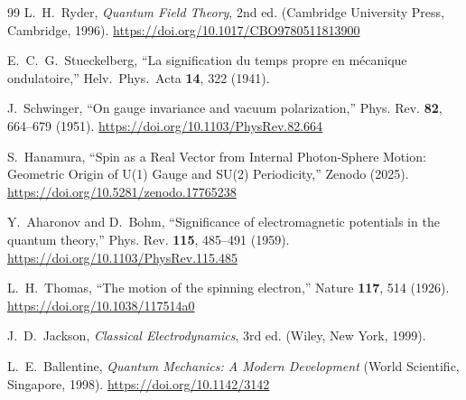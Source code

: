 \documentclass[%
 reprint,
 amsmath,amssymb,
 aps,
 prb,
]{revtex4-2}
\numberwithin{equation}{section}
\begin{document}
\begin{thebibliography}{99}
L.~H.~Ryder,
\textit{Quantum Field Theory}, 2nd ed.
(Cambridge University Press, Cambridge, 1996).
\href{https://doi.org/10.1017/CBO9780511813900}{https://doi.org/10.1017/CBO9780511813900}

E.~C.~G.~Stueckelberg,
``La signification du temps propre en m\'ecanique ondulatoire,''
Helv.\ Phys.\ Acta {\bf 14}, 322 (1941).

J.~Schwinger,
``On gauge invariance and vacuum polarization,''
Phys. Rev. \textbf{82}, 664--679 (1951).
\href{https://doi.org/10.1103/PhysRev.82.664}{https://doi.org/10.1103/PhysRev.82.664}

S.~Hanamura,
``Spin as a Real Vector from Internal Photon-Sphere Motion: Geometric Origin of U(1) Gauge and SU(2) Periodicity,''
Zenodo (2025).
\href{https://doi.org/10.5281/zenodo.17765238}{https://doi.org/10.5281/zenodo.17765238}

Y.~Aharonov and D.~Bohm,
``Significance of electromagnetic potentials in the quantum theory,''
Phys. Rev. \textbf{115}, 485--491 (1959).
\href{https://doi.org/10.1103/PhysRev.115.485}{https://doi.org/10.1103/PhysRev.115.485}

L.~H.~Thomas,
``The motion of the spinning electron,''
Nature \textbf{117}, 514 (1926).
\href{https://doi.org/10.1038/117514a0}{https://doi.org/10.1038/117514a0}

J.~D.~Jackson,
\textit{Classical Electrodynamics}, 3rd ed.
(Wiley, New York, 1999).

L.~E.~Ballentine,
\textit{Quantum Mechanics: A Modern Development}
(World Scientific, Singapore, 1998).
\href{https://doi.org/10.1142/3142}{https://doi.org/10.1142/3142}


\end{thebibliography}
\end{document}
